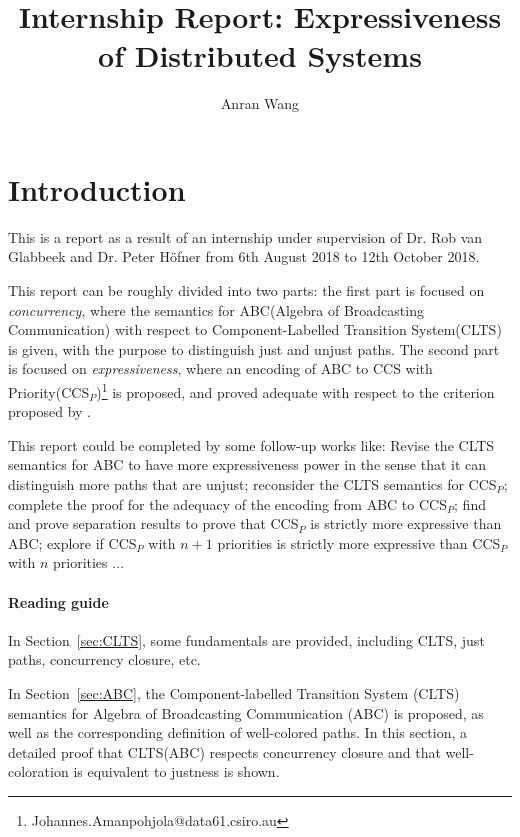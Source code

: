 \documentclass[adraft]{eptcs}
\newcommand{\Sec}[1]{Section~\ref{sec:#1}}
\begin{document}
\title{Internship Report: Expressiveness of Distributed Systems}
\def\titlerunning{Report}
\author{Anran Wang}
\def\authorrunning{Anran Wang}
\maketitle

\section{Introduction}

This is a report as a result of an internship under supervision of Dr. Rob van Glabbeek and Dr. Peter H\"ofner from 6th August 2018 to 12th October 2018.

This report can be roughly divided into two parts: the first part is focused on \emph{concurrency}, where the semantics for ABC(Algebra of Broadcasting Communication)\cite{vGH15} with respect to Component-Labelled Transition System(CLTS) is given, with the purpose to distinguish just and unjust paths. The second part is focused on \emph{expressiveness}, where an encoding of ABC to CCS with Priority(CCS$_P$)\footnote{Johannes.Amanpohjola@data61.csiro.au} is proposed, and proved adequate with respect to the criterion proposed by \cite{G10}.

This report could be completed by some follow-up works like: Revise the CLTS semantics for ABC to have more expressiveness power in the sense that it can distinguish more paths that are unjust; reconsider the CLTS semantics for CCS$_P$; complete the proof for the adequacy of the encoding from ABC to CCS$_P$; find and prove separation results to prove that CCS$_P$ is strictly more expressive than ABC; explore if CCS$_P$ with $n+1$ priorities is strictly more expressive than CCS$_P$ with $n$ priorities $\dots$

\paragraph{Reading guide}

In \Sec{CLTS}, some fundamentals are provided, including CLTS, just paths, concurrency closure, etc.

In \Sec{ABC}, the Component-labelled Transition System (CLTS) semantics for Algebra of Broadcasting Communication (ABC) is proposed, as well as the corresponding definition of well-colored paths. In this section, a detailed proof that CLTS(ABC) respects concurrency closure and that well-coloration is equivalent to justness is shown.
\end{document}
